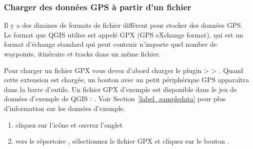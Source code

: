 \subsubsection{Charger des donn\'ees GPS \`a partir d'un
fichier}\label{label_loadgps}

Il y a des dizaines de formats de fichier diff\'erent pour stocker des donn\'ees
GPS.
Le format que QGIS utilise est appel\'e GPX (GPS eXchange format), qui est un
format d'\'echange standard qui peut contenir n'importe quel nombre de waypoints,
itin\'eraire et tracks dans un m\^eme fichier.

Pour charger un fichier GPX vous devez d'abord charger le plugin
 >  > . Quand cette extension est charg\'ee, un bouton avec
un petit p\'eriph\'erique GPS appara\^itra dans la barre d'outils. Un fichier GPX
d'exemple est disponible dans le jeu de donn\'ees d'exemple de QGIS :
. Voir 
Section~\ref{label_sampledata} pour plus d'information sur les donn\'ees
d'exemple.

\begin{enumerate}
\item cliquez sur l'ic\^one  et ouvrez 
l'onglet 
\item {} vers le r\'epertoire ,
s\'electionnez le fichier GPX  et cliquez sur le
bouton .
\end{enumerate}

